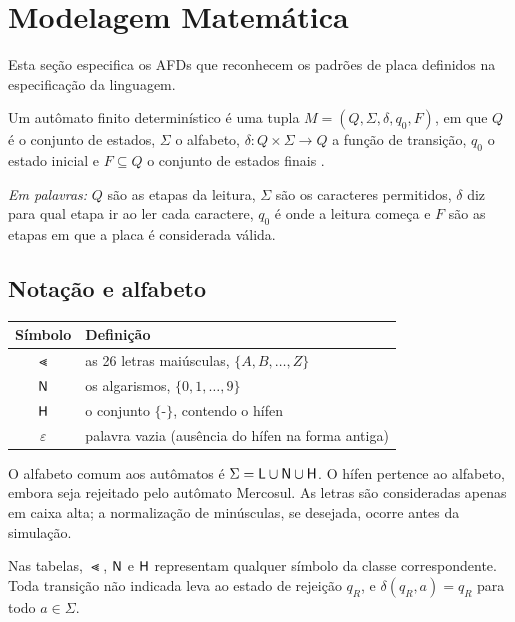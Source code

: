 \section{Modelagem Matemática}
\label{sec:modelagem}

Esta seção especifica os AFDs que reconhecem os padrões de placa
definidos na especificação da linguagem.

\begin{definicao}
Um autômato finito determinístico é uma tupla
$M = (Q, \Sigma, \delta, q_0, F)$, em que $Q$ é o conjunto de
estados, $\Sigma$ o alfabeto, $\delta : Q \times \Sigma \to Q$ a
função de transição, $q_0$ o estado inicial e $F \subseteq Q$ o
conjunto de estados finais \cite{hopcroft2002}.
\end{definicao}

\emph{Em palavras:} $Q$ são as etapas da leitura, $\Sigma$ são os
caracteres permitidos, $\delta$ diz para qual etapa ir ao ler cada
caractere, $q_0$ é onde a leitura começa e $F$ são as etapas em que
a placa é considerada válida.

\subsection{Notação e alfabeto}

\begin{center}
\begin{tabular}{cl}
\toprule
Símbolo & Definição \\
\midrule
$\Lt$ & as 26 letras maiúsculas, $\{A, B, \dots, Z\}$ \\
$\mathsf{N}$ & os algarismos, $\{0, 1, \dots, 9\}$ \\
$\mathsf{H}$ & o conjunto $\{\texttt{-}\}$, contendo o hífen \\
$\varepsilon$ & palavra vazia (ausência do hífen na forma antiga) \\
\bottomrule
\end{tabular}
\end{center}

O alfabeto comum aos autômatos é $\Sigma = \mathsf{L} \cup \mathsf{N} \cup \mathsf{H}$.
O hífen pertence ao alfabeto, embora seja rejeitado pelo autômato
Mercosul. As letras são consideradas apenas em caixa alta; a
normalização de minúsculas, se desejada, ocorre antes da simulação.

Nas tabelas, $\Lt$, $\mathsf{N}$ e $\mathsf{H}$ representam qualquer símbolo da
classe correspondente. Toda transição não indicada leva ao estado
de rejeição $q_R$, e $\delta(q_R, a) = q_R$ para todo $a \in \Sigma$.

